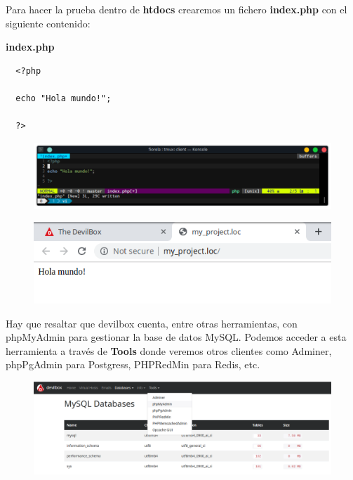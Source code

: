 \documentclass{article}
\begin{document}
Para hacer la prueba dentro de \textbf{htdocs} crearemos un fichero \textbf{index.php} con el
siguiente contenido:

\textbf{index.php}
\begin{verbatim}
  <?php

  echo "Hola mundo!";

  ?>
\end{verbatim}

\begin{figure}[h!]
  \centering
  \includegraphics[scale=0.65]{./Pictures/Devilbox/027_prueba_php.png}
\end{figure}

\begin{figure}[h!]
  \centering
  \includegraphics[scale=0.65]{./Pictures/Devilbox/028_funcional.png}
\end{figure}

Hay que resaltar que devilbox cuenta, entre otras herramientas, con phpMyAdmin
para gestionar la base de datos MySQL. Podemos acceder a esta herramienta a
través de \textbf{Tools} donde veremos otros clientes como Adminer, phpPgAdmin
para Postgress, PHPRedMin para Redis, etc.

\begin{figure}[h!]
  \centering
  \includegraphics[scale=0.5]{./Pictures/Devilbox/030_phpMyAdmin.png}
\end{figure}
\end{document}
